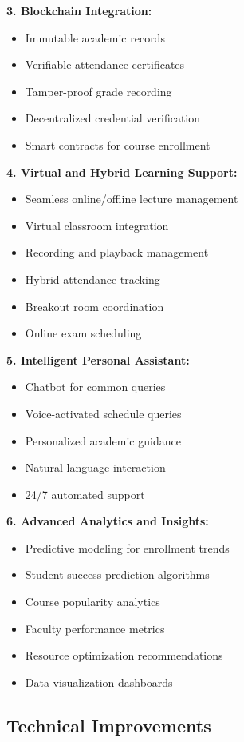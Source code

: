 \textbf{3. Blockchain Integration:}
\begin{itemize}
    \item Immutable academic records
    \item Verifiable attendance certificates
    \item Tamper-proof grade recording
    \item Decentralized credential verification
    \item Smart contracts for course enrollment
\end{itemize}

\textbf{4. Virtual and Hybrid Learning Support:}
\begin{itemize}
    \item Seamless online/offline lecture management
    \item Virtual classroom integration
    \item Recording and playback management
    \item Hybrid attendance tracking
    \item Breakout room coordination
    \item Online exam scheduling
\end{itemize}

\textbf{5. Intelligent Personal Assistant:}
\begin{itemize}
    \item Chatbot for common queries
    \item Voice-activated schedule queries
    \item Personalized academic guidance
    \item Natural language interaction
    \item 24/7 automated support
\end{itemize}

\textbf{6. Advanced Analytics and Insights:}
\begin{itemize}
    \item Predictive modeling for enrollment trends
    \item Student success prediction algorithms
    \item Course popularity analytics
    \item Faculty performance metrics
    \item Resource optimization recommendations
    \item Data visualization dashboards
\end{itemize}

\subsection{Technical Improvements}

